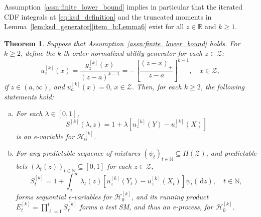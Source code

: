\documentclass[12pt,twoside]{article}
\theoremstyle{plain}
\newtheorem{theorem}{Theorem}
\theoremstyle{definition}
\theoremstyle{remark}
\newcommand{\insquare}[1]{\left[#1\right]}
\newcommand{\N}{\mathbb{N}}
\newcommand{\R}{\mathbb{R}}
\newcommand{\calH}{\mathcal{H}}
\newcommand{\calZ}{\mathcal{Z}}
\newcommand{\diff}{\,\mathrm{d}}
\begin{document}
Assumption~\ref{assn:finite_lower_bound} implies in particular that the iterated CDF integrals at \eqref{eq:ksd_definition} and the truncated moments
in Lemma~\ref{lem:ksd_generator}\ref{item_b:Lemma6} exist for all $z\in \R$ and $k\geq 1$. 
\begin{theorem}
\label{thm:Test-supermartingale-for-the-kSD_null} 
Suppose that Assumption~\ref{assn:finite_lower_bound} holds. For $k \geq 2$, define the $k$-th order normalized utility generator for each $z \in \calZ$:
\begin{equation*}\label{eq:def_kSD_normalized_generator}
    u_z^{[k]}(x) = \frac{g_z^{[k]}(x)}{(z-a)^{k-1}} = -\insquare{\frac{(z-x)_+}{z-a}}^{k-1}, \quad x \in \calZ,
\end{equation*}
if $z \in (a, \infty)$, and $u_a^{[k]}(x) = 0, \, x \in \calZ$. 
Then, for each $k\geq 2$, the following statements hold: 
\begin{enumerate}[(a)]
    \item For each $\lambda \in [0,1]$,
    \begin{equation*}\label{eq:evalue_ksd}
        S^{[k]}(\lambda, z) = 1+\lambda [{u}_z^{[k]}(Y)-{u}_z^{[k]}(X)]
    \end{equation*}
    is an e-variable for $\calH_0^{[k]}$. 
    \item For any predictable sequence of mixtures $(\psi_t)_{t\in \N} \subseteq \Pi(\calZ)$, and predictable bets $(\lambda_t(z))_{t\in \N} \subseteq [0,1]$ for each $z\in \calZ$, 
    \begin{equation*}
        S_t^{[k]} = 1 +\int_a^\infty \lambda_t(z) [{u}_z^{[k]}(Y_t)-{u}_z^{[k]}(X_t)] \psi_t(\diff z), \quad t\in \N, 
    \end{equation*}
    forms sequential e-variables for $\calH_0^{[k]}$, and its running product $E_t^{[k]} = \prod_{\ell=1}^t S_\ell^{[k]}$
    forms a test SM, and thus an e-process, for $\calH_0^{[k]}$. 
\end{enumerate}
\end{theorem}
\end{document}
